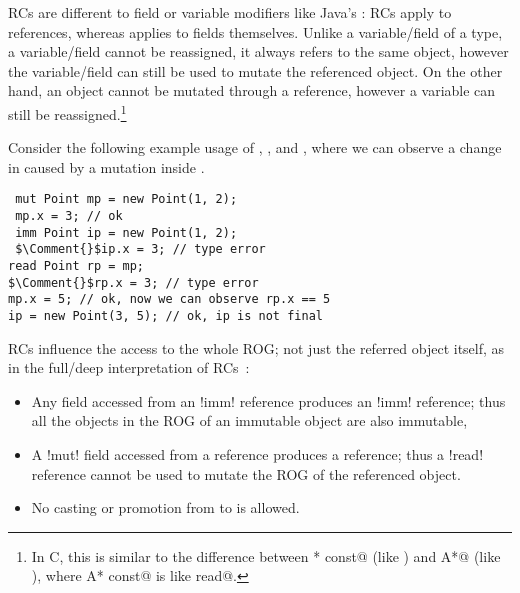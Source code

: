 \noindent RCs are different to field or variable modifiers like Java's \Q@final@: RCs apply to references, whereas \Q@final@ applies to fields themselves. Unlike a variable/field of a \Q@read@ type, a \Q@final@ variable/field cannot be reassigned, it always refers to the same object, however the variable/field can still be used to mutate the referenced object.
On the other hand, an object cannot be mutated through a \Q@read@ reference, however a \Q@read@ variable can still be reassigned.\footnote{In C, this is similar to the difference between \Q@A* const@ (like \Q@final@) and \Q@const A*@ (like \Q@read@), where \Q@const A* const@ is like \Q@final read@.}

Consider the following  example usage of \Q@mut@, \Q@imm@, and \Q@read@, where we can observe a change in \Q@rp@ caused by a mutation inside \Q@mp@.
\begin{lstlisting}
 mut Point mp = new Point(1, 2);
 mp.x = 3; // ok
 imm Point ip = new Point(1, 2);
 $\Comment{}$ip.x = 3; // type error
read Point rp = mp;
$\Comment{}$rp.x = 3; // type error
mp.x = 5; // ok, now we can observe rp.x == 5
ip = new Point(3, 5); // ok, ip is not final
\end{lstlisting} 

RCs influence the access to the whole ROG; not just the referred object itself, as in the full/deep interpretation of RCs~\cite{ZibinEtAl10,Potanin2013}:
\begin{itemize}
  \item Any field accessed from an \Q!imm! reference produces an \Q!imm! reference; thus all the objects in the ROG of an immutable object are also immutable,
  \item A \Q!mut! field accessed from a \Q@read@ reference produces a \Q@read@ reference; thus a \Q!read! reference cannot be used to mutate the ROG of the referenced object.
  \item No casting or promotion from \Q@read@ to \Q@mut@ is allowed.
\end{itemize}

